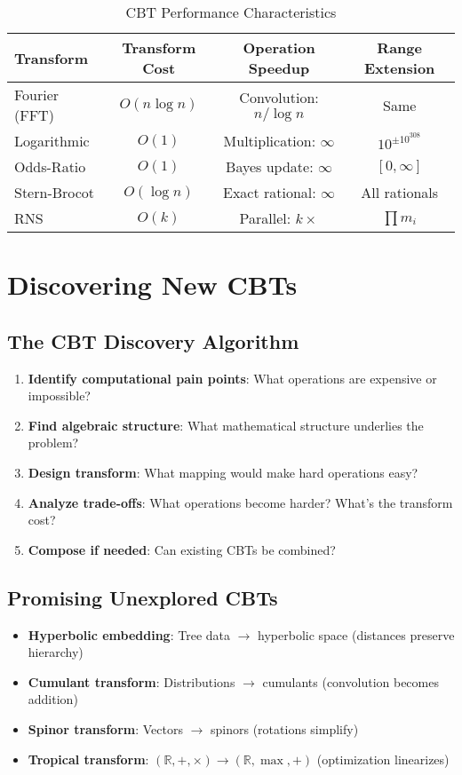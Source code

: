 \documentclass[12pt,a4paper]{article}
\theoremstyle{definition}
\begin{document}
\begin{table}[h]
\centering
\caption{CBT Performance Characteristics}
\begin{tabular}{@{}lccc@{}}
\toprule
Transform & Transform Cost & Operation Speedup & Range Extension\\
\midrule
Fourier (FFT) & $O(n \log n)$ & Convolution: $n/\log n$ & Same\\
Logarithmic & $O(1)$ & Multiplication: $\infty$ & $10^{\pm 10^{308}}$\\
Odds-Ratio & $O(1)$ & Bayes update: $\infty$ & $[0, \infty]$\\
Stern-Brocot & $O(\log n)$ & Exact rational: $\infty$ & All rationals\\
RNS & $O(k)$ & Parallel: $k\times$ & $\prod m_i$\\
\bottomrule
\end{tabular}
\end{table}

\section{Discovering New CBTs}

\subsection{The CBT Discovery Algorithm}

\begin{enumerate}
\item \textbf{Identify computational pain points}: What operations are expensive or impossible?
\item \textbf{Find algebraic structure}: What mathematical structure underlies the problem?
\item \textbf{Design transform}: What mapping would make hard operations easy?
\item \textbf{Analyze trade-offs}: What operations become harder? What's the transform cost?
\item \textbf{Compose if needed}: Can existing CBTs be combined?
\end{enumerate}

\subsection{Promising Unexplored CBTs}

\begin{itemize}
\item \textbf{Hyperbolic embedding}: Tree data $\to$ hyperbolic space (distances preserve hierarchy)
\item \textbf{Cumulant transform}: Distributions $\to$ cumulants (convolution becomes addition)
\item \textbf{Spinor transform}: Vectors $\to$ spinors (rotations simplify)
\item \textbf{Tropical transform}: $(\mathbb{R}, +, \times) \to (\mathbb{R}, \max, +)$ (optimization linearizes)
\end{itemize}
\end{document}
